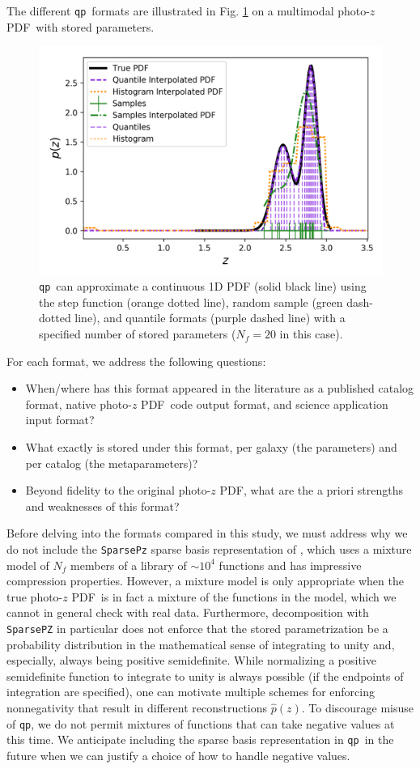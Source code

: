 \documentclass[\docopts]{\docclass}
\newcommand{\qp}{\texttt{qp}}
\newcommand{\pz}{photo-$z$ PDF}
\begin{document}
The different \qp\ formats are illustrated in Fig. \ref{fig:qp} on a multimodal 
\pz\ with stored parameters.
\begin{figure}
  \includegraphics[width=0.9\columnwidth]{figures/demo_pz.png}
  \caption{\qp\ can approximate a continuous 1D PDF (solid black line) using 
the step function (orange dotted line), random sample (green dash-dotted line), 
and quantile formats (purple dashed line) with a specified number of stored 
parameters ($N_{f}=20$ in this case).
  \label{fig:qp}}
\end{figure}
For each format, we address the following questions:
\begin{itemize}
  \item When/where has this format appeared in the literature as a published 
catalog format, native \pz\ code output format, and science application input 
format?
  \item What exactly is stored under this format, per galaxy (the parameters) 
and per catalog (the metaparameters)?
  \item Beyond fidelity to the original \pz, what are the a priori strengths 
and weaknesses of this format?
\end{itemize}

Before delving into the formats compared in this study, we must address why we 
do not include the \texttt{SparsePz} sparse basis representation of 
\citet{carrasco_kind_sparse_2014}, which uses a mixture model of $N_{f}$ 
members of a library of $\sim10^{4}$ functions and has impressive compression 
properties.  However, a mixture model is only appropriate when the true \pz\ is 
in fact a mixture of the functions in the model, which we cannot in general 
check with real data.  Furthermore, decomposition with \texttt{SparsePZ} in 
particular does not enforce that the stored parametrization be a probability 
distribution in the mathematical sense of integrating to unity and, especially, 
always being positive semidefinite.  While normalizing a positive semidefinite 
function to integrate to unity is always possible (if the endpoints of 
integration are specified), one can motivate multiple schemes for enforcing 
nonnegativity that result in different reconstructions $\hat{p}(z)$.  To 
discourage misuse of \qp, we do not permit mixtures of functions that can take 
negative values at this time.  We anticipate including the sparse basis 
representation in \qp\ in the future when we can justify a choice of how to 
handle negative values.
\end{document}
